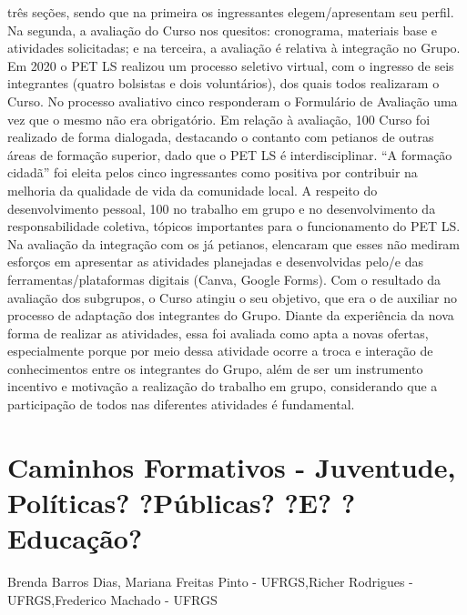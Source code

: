 três seções, sendo que na primeira os ingressantes elegem/apresentam seu perfil. Na segunda, a
avaliação do Curso nos quesitos: cronograma, materiais base e atividades solicitadas; e na
terceira, a avaliação é relativa à integração no Grupo. Em 2020 o PET LS realizou um processo 
seletivo virtual, com o ingresso de seis integrantes (quatro bolsistas e dois voluntários), dos quais 
todos realizaram o Curso. No processo avaliativo cinco responderam o Formulário de Avaliação 
uma vez que o mesmo não era obrigatório. Em relação à avaliação, 100%
Curso foi realizado de forma dialogada, destacando o contanto com petianos de outras áreas de 
formação superior, dado que o PET LS é interdisciplinar. “A formação cidadã” foi eleita pelos 
cinco ingressantes como positiva por contribuir na melhoria da qualidade de vida da comunidade 
local. A respeito do desenvolvimento pessoal, 100%
no trabalho em grupo e no desenvolvimento da responsabilidade coletiva, tópicos importantes 
para o funcionamento do PET LS. Na avaliação da integração com os já petianos, elencaram que 
esses não mediram esforços em apresentar as atividades planejadas e desenvolvidas pelo/e das 
ferramentas/plataformas digitais (Canva, Google Forms). Com o resultado da avaliação dos 
subgrupos, o Curso atingiu o seu objetivo, que era o de auxiliar no processo de adaptação dos
integrantes do Grupo. Diante da experiência da nova forma de realizar as atividades, essa foi 
avaliada como apta a novas ofertas, especialmente porque por meio dessa atividade ocorre a 
troca e interação de conhecimentos entre os integrantes do Grupo, além de ser um instrumento 
incentivo e motivação a realização do trabalho em grupo, considerando que a participação de 
todos nas diferentes atividades é fundamental.




\section*{Caminhos Formativos - Juventude, Políticas? ?Públicas? ?E? ?Educação?}

Brenda Barros Dias, Mariana Freitas Pinto - UFRGS,Richer Rodrigues - UFRGS,Frederico Machado - UFRGS

